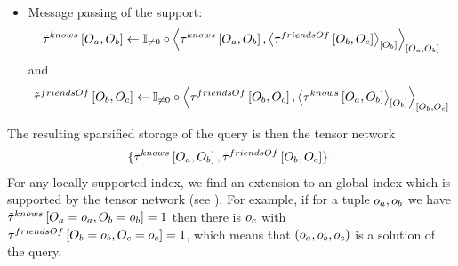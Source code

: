 \begin{example}
\begin{itemize}
{\begin{scope}[shift={(20,0)}]

            \end{scope}
        }
        \item Message passing of the support:
        \begin{align*}
            \tilde{\tau}^{knows}\left[O_{a},O_{b}\right]
            \leftarrow \mathbb{I}_{\neq0}\circ\left\langle 
                \tau^{knows}\left[O_{a},O_{b}\right],
                \left\langle \tau^{friendsOf}\left[O_{b},O_{c}\right]\right\rangle_{\left[ O_{b} \right]}
            \right\rangle_{\left[ O_{a},O_{b} \right]}
        \end{align*}
        and
        \begin{align*}
            \tilde{\tau}^{friendsOf}\left[O_{b},O_{c}\right]
            \leftarrow \mathbb{I}_{\neq0}\circ\left\langle 
                \tau^{friendsOf}\left[O_{b},O_{c}\right],
                \left\langle \tau^{knows}\left[O_{a},O_{b}\right]\right\rangle_{\left[ O_{b} \right]}
            \right\rangle_{\left[ O_{b},O_{c} \right]}
        \end{align*}
    \end{itemize}
    The resulting sparsified storage of the query is then the tensor network
    \begin{align*}
        \{\tilde{\tau}^{knows}\left[O_{a},O_{b}\right],\tilde{\tau}^{friendsOf}\left[O_{b},O_{c}\right]\} \, .
    \end{align*}
    For any locally supported index, we find an extension to an global index which is supported by the tensor network (see ).
    For example, if for a tuple $o_{a},o_{b}$ we have $\tilde{\tau}^{knows}\left[O_{a}=o_{a},O_{b}=o_{b}\right]=1$ then there is $o_{c}$ with $\tilde{\tau}^{friendsOf}\left[O_{b}=o_{b},O_{c}=o_{c}\right]=1$, which means that $(o_{a},o_{b},o_{c})$ is a solution of the query.
\end{example}